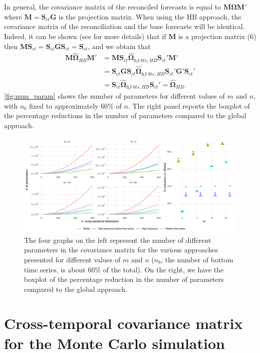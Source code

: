 \documentclass[a4paper,11pt]{article}
\newcommand{\Gvet}{\bm{G}}
\newcommand{\Mvet}{\bm{M}}
\newcommand{\Svet}{\bm{S}}
\newcommand{\Omegavet}{\bm{\Omega}}
\theoremstyle{definition}
\begin{document}
In general, the covariance matrix of the reconciled forecasts is equal to $\Mvet \widehat{\Omegavet} \Mvet'$ where $\Mvet = \Svet_{ct}\Gvet$ is the projection matrix. When using the HB approach, the covariance matrix of the reconciliation and the base forecasts will be identical. Indeed, it can be shown (see \citealp{panagiotelis2021} for more details) that if $\Mvet$ is a projection matrix (6) then $\Mvet\Svet_{ct} = \Svet_{ct}\Gvet\Svet_{ct} = \Svet_{ct}$, and we obtain that
\begin{align*}
	\Mvet \widehat{\Omegavet}_{HB} \Mvet' & = \Mvet\Svet_{ct}\widehat{\Omegavet}_{\textit{hf-bts}, HB}\Svet_{ct}'\Mvet'                      \\
	& = \Svet_{ct}\Gvet\Svet_{ct}\widehat{\Omegavet}_{\textit{hf-bts}, HB}\Svet_{ct}'\Gvet'\Svet_{ct}' \\
	& = \Svet_{ct}\widehat{\Omegavet}_{\textit{hf-bts}, HB}\Svet_{ct}' = \widehat{\Omegavet}_{HB}.
\end{align*}
\autoref{fig:num_param} shows the number of parameters for different values of $m$ and $n$, with $n_b$ fixed to approximately $60\%$ of $n$. The right panel reports the boxplot of the percentage reductions in the number of parameters compared to the global approach.
\begin{figure}[!t]
	\centering
	\includegraphics[width = \linewidth]{fig/parameters.pdf}
	\caption{The four graphs on the left represent the number of different parameters in the covariance matrix for the various approaches presented for different values of $m$ and $n$ ($n_b$, the number of bottom time series, is about $60\%$ of the total). On the right, we have the boxplot of the percentage reduction in the number of parameters compared to the global approach.}
	\label{fig:num_param}
\end{figure}

\newpage
\section{Cross-temporal covariance matrix for the Monte Carlo simulation}\label{app:ar2}
\end{document}
